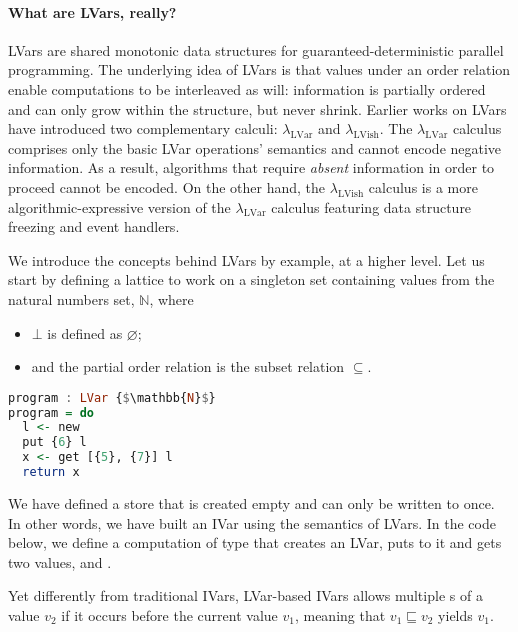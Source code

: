 \documentclass[main.tex]{subfiles}
\begin{document}
\paragraph{What are LVars, really?} LVars are shared monotonic data structures for guaranteed-deterministic parallel programming. The underlying idea of LVars is that values under an order relation enable computations to be interleaved as will: information is partially ordered and can only grow within the structure, but never shrink. Earlier works on LVars have introduced two complementary calculi: $\lambda_{\text{LVar}}$ and $\lambda_{\text{LVish}}$. The $\lambda_{\text{LVar}}$ calculus comprises only the basic LVar operations' semantics and cannot encode negative information. As a result, algorithms that require \textit{absent} information in order to proceed cannot be encoded. On the other hand, the $\lambda_{\text{LVish}}$ calculus is a more algorithmic-expressive version of the $\lambda_{\text{LVar}}$ calculus featuring data structure freezing and event handlers.

We introduce the concepts behind LVars by example, at a higher level. Let us start by defining a lattice to work on a singleton set containing values from the natural numbers set, $\mathbb{N}$, where
\begin{itemize}
\item $\bot$ is defined as $\varnothing$;
\item and the partial order relation is the subset relation $\subseteq$.
\end{itemize}

\begin{marginfigure}
\begin{lstlisting}[language=Haskell]
program : LVar {$\mathbb{N}$}
program = do
  l <- new
  put {6} l
  x <- get [{5}, {7}] l
  return x
\end{lstlisting}
\end{marginfigure}

We have defined a store that is created empty and can only be written to once. In other words, we have built an IVar using the semantics of LVars. In the code below, we define a computation  of type  that creates an LVar, puts  to it and gets two values,  and .

Yet differently from traditional IVars, LVar-based IVars allows multiple s of a value $v_2$ if it occurs before the current value $v_1$, meaning that $v_1 \sqsubseteq v_2$ yields $v_1$.
\end{document}
